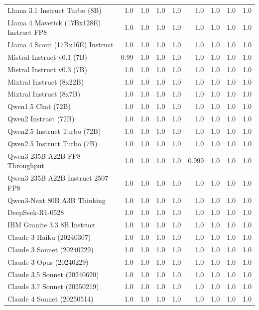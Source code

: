 \begin{table}[htp]
{\begin{tabular}{lrrrrrrrr}
Llama 3.1 Instruct Turbo (8B) & 1.0 & 1.0 & 1.0 & 1.0 & 1.0 & 1.0 & 1.0 & 1.0 \\
Llama 4 Maverick (17Bx128E) Instruct FP8 & 1.0 & 1.0 & 1.0 & 1.0 & 1.0 & 1.0 & 1.0 & 1.0 \\
Llama 4 Scout (17Bx16E) Instruct & 1.0 & 1.0 & 1.0 & 1.0 & 1.0 & 1.0 & 1.0 & 1.0 \\
Mistral Instruct v0.1 (7B) & 0.99 & 1.0 & 1.0 & 1.0 & 1.0 & 1.0 & 1.0 & 1.0 \\
Mistral Instruct v0.3 (7B) & 1.0 & 1.0 & 1.0 & 1.0 & 1.0 & 1.0 & 1.0 & 1.0 \\
Mixtral Instruct (8x22B) & 1.0 & 1.0 & 1.0 & 1.0 & 1.0 & 1.0 & 1.0 & 1.0 \\
Mixtral Instruct (8x7B) & 1.0 & 1.0 & 1.0 & 1.0 & 1.0 & 1.0 & 1.0 & 1.0 \\
Qwen1.5 Chat (72B) & 1.0 & 1.0 & 1.0 & 1.0 & 1.0 & 1.0 & 1.0 & 1.0 \\
Qwen2 Instruct (72B) & 1.0 & 1.0 & 1.0 & 1.0 & 1.0 & 1.0 & 1.0 & 1.0 \\
Qwen2.5 Instruct Turbo (72B) & 1.0 & 1.0 & 1.0 & 1.0 & 1.0 & 1.0 & 1.0 & 1.0 \\
Qwen2.5 Instruct Turbo (7B) & 1.0 & 1.0 & 1.0 & 1.0 & 1.0 & 1.0 & 1.0 & 1.0 \\
Qwen3 235B A22B FP8 Throughput & 1.0 & 1.0 & 1.0 & 1.0 & 0.999 & 1.0 & 1.0 & 1.0 \\
Qwen3 235B A22B Instruct 2507 FP8 & 1.0 & 1.0 & 1.0 & 1.0 & 1.0 & 1.0 & 1.0 & 1.0 \\
Qwen3-Next 80B A3B Thinking & 1.0 & 1.0 & 1.0 & 1.0 & 1.0 & 1.0 & 1.0 & 1.0 \\
DeepSeek-R1-0528 & 1.0 & 1.0 & 1.0 & 1.0 & 1.0 & 1.0 & 1.0 & 1.0 \\
IBM Granite 3.3 8B Instruct & 1.0 & 1.0 & 1.0 & 1.0 & 1.0 & 1.0 & 1.0 & 1.0 \\
Claude 3 Haiku (20240307) & 1.0 & 1.0 & 1.0 & 1.0 & 1.0 & 1.0 & 1.0 & 1.0 \\
Claude 3 Sonnet (20240229) & 1.0 & 1.0 & 1.0 & 1.0 & 1.0 & 1.0 & 1.0 & 1.0 \\
Claude 3 Opus (20240229) & 1.0 & 1.0 & 1.0 & 1.0 & 1.0 & 1.0 & 1.0 & 1.0 \\
Claude 3.5 Sonnet (20240620) & 1.0 & 1.0 & 1.0 & 1.0 & 1.0 & 1.0 & 1.0 & 1.0 \\
Claude 3.7 Sonnet (20250219) & 1.0 & 1.0 & 1.0 & 1.0 & 1.0 & 1.0 & 1.0 & 1.0 \\
Claude 4 Sonnet (20250514) & 1.0 & 1.0 & 1.0 & 1.0 & 1.0 & 1.0 & 1.0 & 1.0 \\

\end{tabular}}
\end{table}
